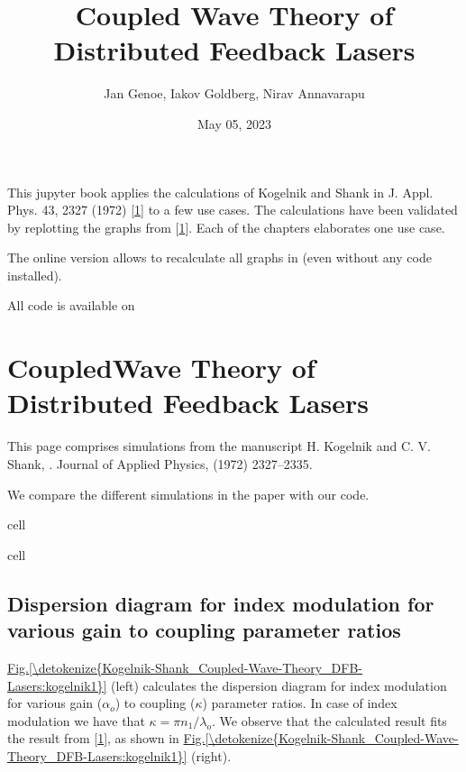 \documentclass[a4paper,10pt,english,openany,oneside]{jupyterBook}
\title{Coupled Wave Theory of Distributed Feedback Lasers}
\date{May 05, 2023}
\author{Jan Genoe, Iakov Goldberg, Nirav Annavarapu}
\begin{document}
\pagestyle{empty}
\sphinxmaketitle
\pagestyle{plain}
\sphinxtableofcontents
\pagestyle{normal}
\label{\detokenize{intro::doc}}


\sphinxAtStartPar
This jupyter book applies the calculations of Kogelnik and Shank in J. Appl. Phys. 43, 2327 (1972) {[}\hyperlink{cite.bib:id3}{1}{]} to a few use cases.
The calculations have been validated by replotting the graphs from {[}\hyperlink{cite.bib:id3}{1}{]}.
Each of the chapters elaborates one use case.

\sphinxAtStartPar
The online version allows to recalculate all graphs in  (even without any code installed).

\sphinxAtStartPar
All code is available on 

\sphinxstepscope


\chapter{Coupled\sphinxhyphen{}Wave Theory of Distributed Feedback Lasers}
\label{\detokenize{Kogelnik-Shank_Coupled-Wave-Theory_DFB-Lasers:coupled-wave-theory-of-distributed-feedback-lasers}}\label{\detokenize{Kogelnik-Shank_Coupled-Wave-Theory_DFB-Lasers::doc}}
\sphinxAtStartPar
This page comprises simulations from the manuscript H. Kogelnik and C. V. Shank, . Journal of Applied Physics,  (1972) 2327–2335. 

\sphinxAtStartPar
We compare the different simulations in the paper with our code.

\begin{sphinxuseclass}{cell}
\end{sphinxuseclass}
\begin{sphinxuseclass}{cell}
\end{sphinxuseclass}

\section{Dispersion diagram for index modulation for various gain to coupling parameter ratios}
\label{\detokenize{Kogelnik-Shank_Coupled-Wave-Theory_DFB-Lasers:dispersion-diagram-for-index-modulation-for-various-gain-to-coupling-parameter-ratios}}
\sphinxAtStartPar
\hyperref[\detokenize{Kogelnik-Shank_Coupled-Wave-Theory_DFB-Lasers:kogelnik1}]{Fig.\@ \ref{\detokenize{Kogelnik-Shank_Coupled-Wave-Theory_DFB-Lasers:kogelnik1}}} (left) calculates the dispersion diagram for index modulation for various gain (\(\alpha_o\)) to coupling (\(\kappa\)) parameter ratios. In case of index modulation we have that \(\kappa= \pi n_1/\lambda_o\). We observe that the calculated result fits the result from {[}\hyperlink{cite.bib:id3}{1}{]}, as shown in \hyperref[\detokenize{Kogelnik-Shank_Coupled-Wave-Theory_DFB-Lasers:kogelnik1}]{Fig.\@ \ref{\detokenize{Kogelnik-Shank_Coupled-Wave-Theory_DFB-Lasers:kogelnik1}}} (right).
\end{document}
